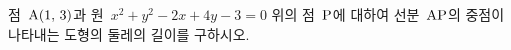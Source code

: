 점~$\mathrm{A}(1,\mkern3mu 3)$과 원~$x^2+y^2-2x+4y-3=0$ 위의 점~$\mathrm{P}$에 대하여 선분~$\mathrm{AP}$의 중점이 나타내는 도형의 둘레의 길이를 구하시오.
